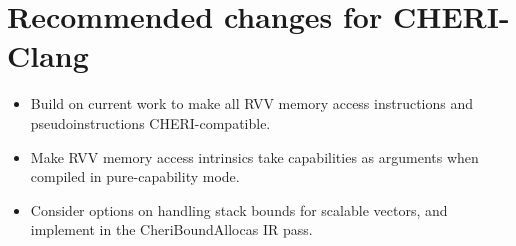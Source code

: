 \section{Recommended changes for CHERI-Clang}
\begin{itemize}
    \item Build on current work to make all RVV memory access instructions and pseudoinstructions CHERI-compatible.
    \item Make RVV memory access intrinsics take capabilities as arguments when compiled in pure-capability mode.
    \item Consider options on handling stack bounds for scalable vectors, and implement in the CheriBoundAllocas IR pass.
\end{itemize}
